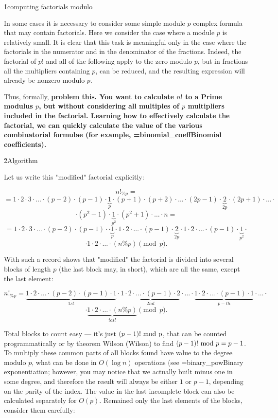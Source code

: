 \h1{computing factorials modulo}

In some cases it is necessary to consider some simple module $p$ complex formula that may contain factorials. Here we consider the case where a module $p$ is relatively small. It is clear that this task is meaningful only in the case where the factorials in the numerator and in the denominator of the fractions. Indeed, the factorial of $p!$ and all of the following apply to the zero modulo $p$, but in fractions all the multipliers containing $p$, can be reduced, and the resulting expression will already be nonzero modulo $p$.

Thus, formally, \bf{problem} this. You want to calculate $n!$ to a Prime modulus $p$, but without considering all multiples of $p$ multipliers included in the factorial. Learning how to effectively calculate the factorial, we can quickly calculate the value of the various combinatorial formulae (for example, \algohref=binomial_coeff{Binomial coefficients}).


\h2{Algorithm}

Let us write this "modified" factorial explicitly:

$$ n!_{\%p} = $$
$$ = 1 \cdot 2 \cdot 3 \cdot \ldots \cdot (p-2) \cdot (p-1) \cdot \underbrace{1}_{p} \cdot (p+1) \cdot (p+2) \cdot \ldots \cdot (2p-1) \cdot \underbrace{2}_{2p} \cdot (2p+1) \cdot \ldots \cdot $$
$$ \cdot (p^2-1) \cdot \underbrace{1}_{p^2} \cdot (p^2+1) \cdot \ldots \cdot n = $$
$$ = 1 \cdot 2 \cdot 3 \cdot \ldots \cdot (p-2) \cdot (p-1) \cdot \cdot \underbrace{1}_{p} \cdot 1 \cdot 2 \cdot \ldots \cdot (p-1) \cdot \underbrace{2}_{2p} \cdot 1 \cdot 2 \cdot \ldots \cdot (p-1) \cdot \underbrace{1}_{p^2} \cdot $$
$$ \cdot 1 \cdot 2 \cdot \ldots \cdot (n\%p) \pmod p. $$

With such a record shows that "modified" the factorial is divided into several blocks of length $p$ (the last block may, in short), which are all the same, except the last element:

$$ n!_{\%p} = \underbrace{ 1 \cdot 2 \cdot \ldots \cdot (p-2) \cdot (p-1) \cdot 1}_{1st} \cdot \underbrace{ 1 \cdot 2 \cdot \ldots \cdot (p-1) \cdot 2 }_{2nd} \cdot \ldots \cdot \underbrace{ 1 \cdot 2 \cdot \ldots \cdot (p-1) \cdot 1 }_{p-th} \cdot \ldots \cdot $$
$$ \cdot \underbrace{ 1 \cdot 2 \cdot \ldots \cdot (n\%p)}_{tail} \pmod p. $$

Total blocks to count easy --- it's just $(p-1)!\ \rm{mod}\ p$, that can be counted programmatically or by theorem Wilson (Wilson) to find $(p-1)!\ {\rm mod}\ p = p-1$. To multiply these common parts of all blocks found have value to the degree modulo $p$, what can be done in $O(\log n)$ operations (see \algohref=binary_pow{Binary exponentiation}; however, you may notice that we actually built minus one in some degree, and therefore the result will always be either $1$ or $p-1$, depending on the parity of the index. The value in the last incomplete block can also be calculated separately for $O(p)$. Remained only the last elements of the blocks, consider them carefully:


